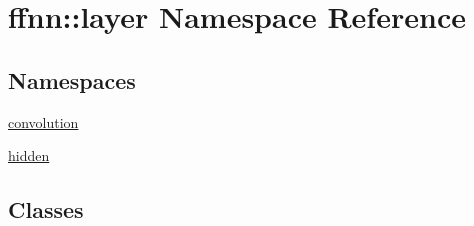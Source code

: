 \hypertarget{namespaceffnn_1_1layer}{\section{ffnn\-:\-:layer Namespace Reference}
\label{namespaceffnn_1_1layer}
}
\subsection*{Namespaces}
\begin{DoxyCompactItemize}
\item 
\hyperlink{namespaceffnn_1_1layer_1_1convolution}{convolution}
\item 
\hyperlink{namespaceffnn_1_1layer_1_1hidden}{hidden}
\end{DoxyCompactItemize}
\subsection*{Classes}
